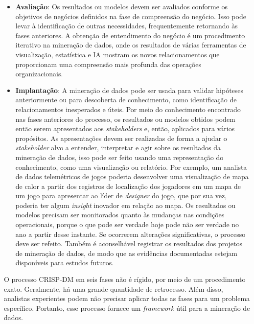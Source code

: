 \begin{itemize}
  \item
\textbf{Avaliação}: Os resultados ou modelos devem ser avaliados conforme os objetivos de negócios definidos na fase de compreensão do negócio. Isso pode levar à identificação de outras necessidades, frequentemente retornando às fases anteriores. A obtenção de entendimento do negócio é um procedimento iterativo na mineração de dados, onde os resultados de várias ferramentas de visualização, estatística e IA mostram os novos relacionamentos que proporcionam uma compreensão mais profunda das operações organizacionais.
  \item
\textbf{Implantação}: A mineração de dados pode ser usada para validar hipóteses anteriormente  ou para descoberta de conhecimento, como identificação de relacionamentos inesperados e úteis. Por meio do conhecimento encontrado nas fases anteriores do processo, os resultados ou modelos obtidos podem então serem apresentados aos \textit{stakeholders} e, então, aplicados para vários propósitos. As apresentações devem ser realizadas de forma a ajudar o \textit{stakeholder} alvo a entender, interpretar e agir sobre os resultados da mineração de dados, isso pode ser feito usando uma representação do conhecimento, como uma visualização ou relatório. Por exemplo, um analista de dados telemétricos de jogos poderia desenvolver uma visualização de mapa de calor a partir dos registros de localização dos jogadores em um mapa de um jogo para apresentar ao líder de \textit{designer} do jogo, que por sua vez, poderia ter algum \textit{insight} inovador em relação ao mapa. Os resultados ou modelos precisam ser monitorados quanto  {\`a}s mudanças nas condições operacionais, porque o que pode ser verdade hoje pode não ser verdade no ano a partir desse instante. Se ocorrerem alterações significativas, o processo deve ser refeito. Também é aconselhável registrar os resultados dos projetos de mineração de dados, de modo que as evidências documentadas estejam disponíveis para estudos futuros.

\end{itemize}
O processo CRISP-DM em seis fases não é rígido, por meio de um procedimento exato. Geralmente, há uma grande quantidade de retrocesso. Além disso, analistas experientes podem não precisar aplicar todas as fases para um problema específico. Portanto, esse processo fornece um \textit{framework} útil para a mineração de dados.

